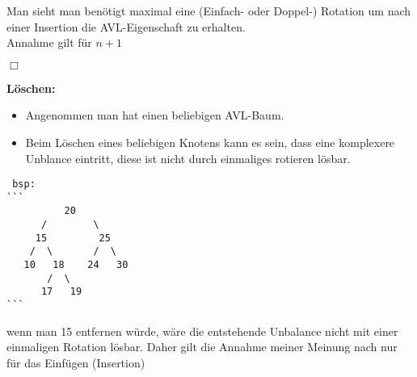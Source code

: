 Man sieht man benötigt maximal eine (Einfach- oder Doppel-) Rotation um nach einer Insertion die AVL-Eigenschaft zu erhalten.\\
Annahme gilt für $n+1$
\begin{flushright}
	$\Box$
\end{flushright}


\textbf{Löschen:}
\begin{itemize}
	\item Angenommen man hat einen beliebigen AVL-Baum. 
	\item Beim Löschen eines beliebigen Knotens kann es sein, dass eine komplexere Unblance eintritt, diese ist nicht durch einmaliges rotieren lösbar.
\end{itemize}
\begin{verbatim}
 bsp:
```
          20
      /        \
     15         25
    /  \       /  \
   10   18    24   30
       /  \
      17   19
```
\end{verbatim}

wenn man 15 entfernen würde, wäre die entstehende Unbalance nicht mit einer einmaligen Rotation lösbar. Daher gilt die Annahme meiner Meinung nach nur für das Einfügen (Insertion)